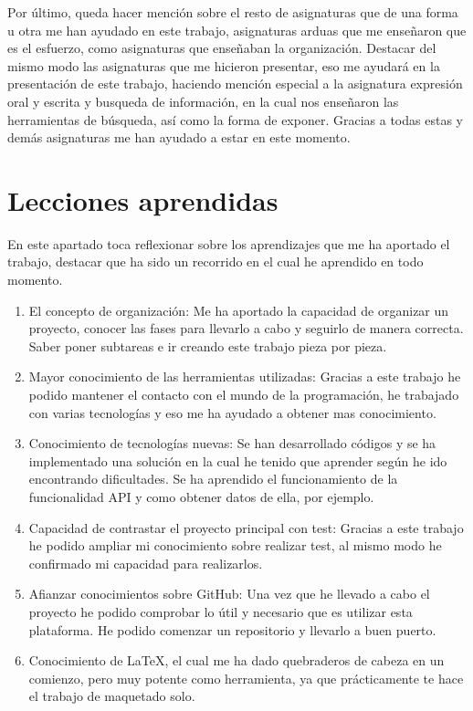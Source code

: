 \documentclass[a4paper, 12pt]{book}
\begin{document}
Por último, queda hacer mención sobre el resto de asignaturas que de una forma u otra me han ayudado en este trabajo, asignaturas arduas que me enseñaron que es el esfuerzo, como asignaturas que enseñaban la organización. Destacar del mismo modo las asignaturas que me hicieron presentar, eso me ayudará en la presentación de este trabajo, haciendo mención especial a la asignatura expresión oral y escrita y busqueda de información, en la cual nos enseñaron las herramientas de búsqueda, así como la forma de exponer. Gracias a todas estas y demás asignaturas me han ayudado a estar en este momento.

\section{Lecciones aprendidas}
\label{sec:lecciones_aprendidas}

En este apartado toca reflexionar sobre los aprendizajes que me ha aportado el trabajo, destacar que ha sido un recorrido en el cual he aprendido en todo momento.

\begin{enumerate}
  \item El concepto de organización: Me ha aportado la capacidad de organizar un proyecto, conocer las fases para llevarlo a cabo y seguirlo de manera correcta. Saber poner subtareas e ir creando este trabajo pieza por pieza.
  \item Mayor conocimiento de las herramientas utilizadas: Gracias a este trabajo he podido mantener el contacto con el mundo de la programación, he trabajado con varias tecnologías y eso me ha ayudado a obtener mas conocimiento.
  \item Conocimiento de tecnologías nuevas: Se han desarrollado códigos y se ha implementado una solución en la cual he tenido que aprender según he ido encontrando dificultades. 
  Se ha aprendido el funcionamiento de la funcionalidad API y como obtener datos de ella, por ejemplo.
  \item Capacidad de contrastar el proyecto principal con test: Gracias a este trabajo he podido ampliar mi conocimiento sobre realizar test, al mismo modo he confirmado mi capacidad para realizarlos.
  \item Afianzar conocimientos sobre GitHub: Una vez que he llevado a cabo el proyecto he podido comprobar lo útil y necesario que es utilizar esta plataforma. He podido comenzar un repositorio y llevarlo a buen puerto.
  \item Conocimiento de \LaTeX, el cual me ha dado quebraderos de cabeza en un comienzo, pero muy potente como herramienta, ya que prácticamente te hace el trabajo de maquetado solo.
\end{enumerate}
\end{document}
